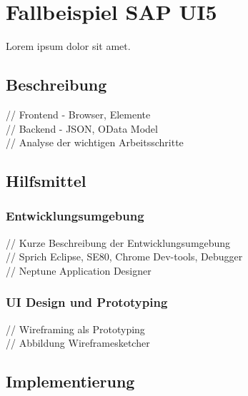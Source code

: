 \documentclass[12pt,a4paper,bibliography=totocnumbered,listof=totocnumbered]{scrartcl}
\begin{document}
\section{Fallbeispiel SAP UI5}
Lorem ipsum dolor sit amet.

\subsection{Beschreibung}
// Frontend - Browser, Elemente\\
// Backend - JSON, OData Model\\
// Analyse der wichtigen Arbeitsschritte\\

\subsection{Hilfsmittel}
\subsubsection{Entwicklungsumgebung}
// Kurze Beschreibung der Entwicklungsumgebung\\
// Sprich Eclipse, SE80, Chrome Dev-tools, Debugger\\
// Neptune Application Designer\\

\subsubsection{UI Design und Prototyping}
// Wireframing als Prototyping\\
// Abbildung Wireframesketcher\\

\subsection{Implementierung}
\end{document}
